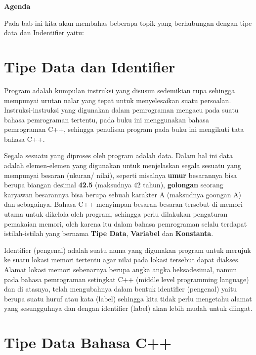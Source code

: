\textbf{Agenda}

Pada bab ini kita akan membahas beberapa topik yang berhubungan dengan tipe data dan Indentifier yaitu:

\minitoc

\section{Tipe Data dan Identifier}\label{tipe-data-dan-identifier}

Program adalah kumpulan instruksi yang disusun sedemikian rupa sehingga
mempunyai urutan nalar yang tepat untuk menyelesaikan suatu persoalan.
Instruksi-instruksi yang digunakan dalam pemrograman mengacu pada suatu
bahasa pemrograman tertentu, pada buku ini menggunakan bahasa
pemrograman C++, sehingga penulisan program pada buku ini mengikuti tata
bahasa C++.

Segala sesuatu yang diproses oleh program adalah data. Dalam hal ini
data adalah elemen-elemen yang digunakan untuk menjelaskan segala
sesuatu yang mempunyai besaran (ukuran/ nilai), seperti misalnya
\textbf{umur} besarannya bisa berupa biangan desimal \textbf{42.5}
(maksudnya 42\textonehalf{} tahun), \textbf{golongan} seorang karyawan besarannya
bisa berupa sebuah karakter A (maksudnya goongan A) dan sebagainya.
Bahasa C++ menyimpan besaran-besaran tersebut di memori utama untuk
dikelola oleh program, sehingga perlu dilakukan pengaturan pemakaian
memori, oleh karena itu dalam bahasa pemrograman selalu terdapat
istilah-istilah yang bernama \textbf{Tipe Data}, \textbf{Variabel} dan
\textbf{Konstanta}.

Identifier (pengenal) adalah suatu nama yang digunakan program untuk
merujuk ke suatu lokasi memori tertentu agar nilai pada lokasi tersebut
dapat diakses. Alamat lokasi memori sebenarnya berupa angka angka
heksadesimal, namun pada bahasa pemrograman
setingkat C++ (middle level programming language)
 dan di atasnya, telah
mengubahnya dalam bentuk identifier (pengenal) yaitu berupa suatu huruf
atau kata (label) sehingga kita tidak perlu mengetahu alamat yang
sesungguhnya dan dengan identifier (label) akan lebih mudah untuk
diingat.

\section{Tipe Data Bahasa C++}\label{tipe-data-bahasa-c}


